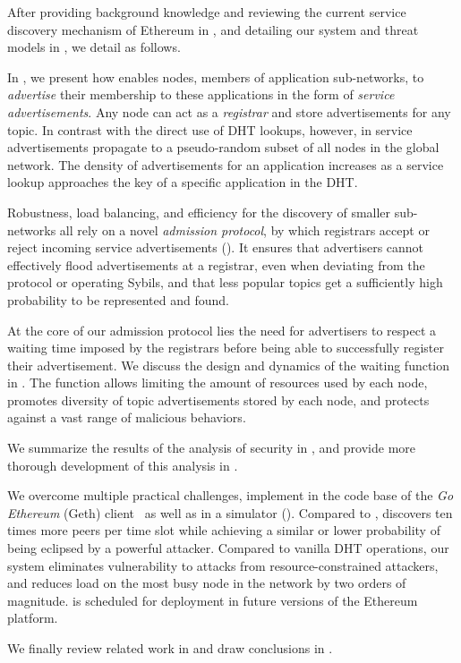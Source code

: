 After providing background knowledge and reviewing the current service discovery mechanism of Ethereum in , and detailing our system and threat models in , we detail \sysname as follows.

In , we present how \sysname enables nodes, members of application sub-networks, to \emph{advertise} their membership to these applications in the form of \emph{service advertisements}.
Any node can act as a \emph{registrar} and store advertisements for any topic.
In contrast with the direct use of DHT lookups, however, in \sysname service advertisements propagate to a pseudo-random subset of all nodes in the global network.
The density of advertisements for an application increases as a service lookup approaches the key of a specific application in the DHT.

Robustness, load balancing, and efficiency for the discovery of smaller sub-networks all rely on a novel \emph{admission protocol}, by which registrars accept or reject incoming service advertisements ().
It ensures that advertisers cannot effectively flood advertisements at a registrar, even when deviating from the protocol or operating Sybils, and that less popular topics get a sufficiently high probability to be represented and found.

At the core of our admission protocol lies the need for advertisers to respect a waiting time imposed by the registrars before being able to successfully register their advertisement.
We discuss the design and dynamics of the waiting function in .
The function allows limiting the amount of resources used by each node, promotes diversity of topic advertisements stored by each node, and protects against a vast range of malicious behaviors.

We summarize the results of the analysis of \sysname security in , and provide more thorough development of this analysis in .

We overcome multiple practical challenges, implement \sysname in the code base of the \emph{Go Ethereum} (Geth) client~\cite{geth} as well as in a simulator ().
Compared to \discv, \sysname discovers ten times more peers per time slot while achieving a similar or lower probability of being eclipsed by a powerful attacker.
Compared to vanilla DHT operations, our system eliminates vulnerability to attacks from resource-constrained attackers, and reduces load on the most busy node in the network by two orders of magnitude.
\sysname is scheduled for deployment in future versions of the Ethereum platform. 

We finally review related work in  and draw conclusions in .
 